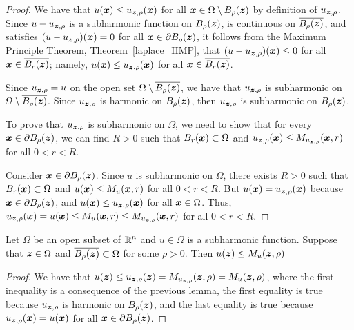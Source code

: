 \begin{proof}
 We have that $u({\bm{x}}) \leq u_{{\bm{z}},\rho}({\bm{x}})$ for
all ${\bm{x}} \in \Omega \setminus B_{\rho}({\bm{z}})$ by definition of
$u_{{\bm{z}},\rho}$.
Since $u - u_{{\bm{z}},\rho}$ is a subharmonic function on $B_{\rho}({\bm{z}})$,
is continuous on $\overline{B_{\rho}({\bm{z}})}$, and satisfies
$(u-u_{{\bm{z}},\rho})({\bm{x}}) = 0$ for all
${\bm{x}} \in \partial B_{\rho}({\bm{z}})$,
it follows from the Maximum Principle Theorem,
Theorem~\ref{laplace_HMP}, that $(u-u_{{\bm{z}},\rho})({\bm{x}}) \leq 0$
for all ${\bm{x}} \in \overline{B_r({\bm{z}})}$; namely,
$u({\bm{x}}) \leq u_{{\bm{z}},\rho}({\bm{x}})$
for all ${\bm{x}} \in \overline{B_r({\bm{z}})}$.

  Since $u_{{\bm{z}},\rho} = u$ on the open set
$\Omega \setminus \overline{B_{\rho}({\bm{z}})}$, we have that
$u_{{\bm{z}},\rho}$ is subharmonic on
$\Omega \setminus \overline{B_{\rho}({\bm{z}})}$.
Since $u_{{\bm{z}},\rho}$ is harmonic on $B_\rho({\bm{z}})$, then
$u_{{\bm{z}},\rho}$ is subharmonic on $B_\rho({\bm{z}})$.

To prove that $u_{{\bm{z}},\rho}$ is subharmonic on $\Omega$, we need
to show that for every ${\bm{x}} \in \partial B_{\rho}({\bm{z}})$, we
can find $R>0$ such that $B_r({\bm{x}}) \subset \Omega$ and
$u_{{\bm{z}},\rho}({\bm{x}}) \leq M_{u_{{\bm{z}},\rho}}({\bm{x}},r)$
for all $0 < r < R$.

Consider ${\bm{x}} \in \partial B_{\rho}({\bm{z}})$.  Since $u$ is
subharmonic on $\Omega$, there exists $R>0$ such that
$B_r({\bm{x}}) \subset \Omega$ and $u({\bm{x}}) \leq M_u({\bm{x}},r)$
for all $0 < r < R$.  But $u({\bm{x}}) = u_{{\bm{z}},\rho}({\bm{x}})$ because
${\bm{x}} \in \partial B_{\rho}({\bm{z}})$, and
$u({\bm{x}}) \leq u_{{\bm{z}},\rho}({\bm{x}})$ for all ${\bm{x}} \in \Omega$.
Thus,
$u_{{\bm{z}},\rho}({\bm{x}}) = u({\bm{x}}) \leq M_u({\bm{x}},r)
\leq M_{u_{{\bm{z}},\rho}}({\bm{x}},r)$
for all $0 < r < R$.
\end{proof}

\begin{lemma} \label{PerromLem2}
Let $\Omega$ be an open subset of $\displaystyle \mathbb{R}^n$ and $u \in \Omega$ is a
subharmonic function.   Suppose that ${\bm{z}} \in \Omega$
and $\overline{B_{\rho}({\bm{z}})} \subset \Omega$ for some $\rho >0$.  Then
$u({\bm{z}}) \leq M_u({\bm{z}},\rho)$
\end{lemma}

\begin{proof}
We have that
$\displaystyle
u({\bm{z}}) \leq u_{{\bm{z}},\rho}({\bm{z}}) = M_{u_{{\bm{z}},\rho}}({\bm{z}},\rho)
= M_u({\bm{z}},\rho)$,
where the first inequality is a consequence of the previous lemma, the
first equality is true because $u_{{\bm{z}},\rho}$ is harmonic on
$B_{\rho}({\bm{z}})$, and the last equality is true because
$u_{{\bm{z}},\rho}({\bm{x}}) = u({\bm{x}})$ for all
${\bm{x}} \in \partial B_{\rho}({\bm{z}})$.
\end{proof}

